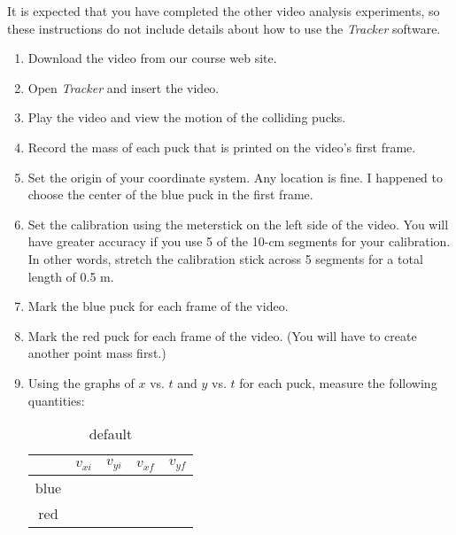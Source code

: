 It is expected that you have completed the other video analysis experiments, so these instructions do not include details about how to use the \emph{Tracker} software.

\begin{enumerate}
	\item Download the video  from our course web site.
	\item Open \emph{Tracker} and insert the video.
	\item Play the video and view the motion of  the colliding pucks.
	\item Record the mass of each puck that is printed on the video's first frame.
	
	
	\item Set the origin of your coordinate system. Any location is fine. I happened to choose the center of the blue puck in the first frame.
	\item Set the calibration using the meterstick on the left side of the video. You will have greater accuracy if you use 5 of the 10-cm segments for your calibration. In other words, stretch the calibration stick across 5 segments for a total length of 0.5 m.
	\item Mark the blue puck for each frame of the video.
	\item Mark the red puck for each frame of the video. (You will have to create another point mass first.)
	\item Using the graphs of $x$ vs. $t$ and $y$ vs. $t$ for each puck, measure the following quantities:
	
\begin{table}[htdp]
\caption{default}
\begin{center}
\begin{tabular}{|c|c|c|c|c|}
\hline
 & $v_{xi}$ & $v_{yi}$ & $v_{xf}$ & $v_{yf}$ \\
\hline
\hline
blue & & & & \\
\hline
red & & & & \\
\hline
\end{tabular}
\end{center}
\label{default}
\end{table}%

\end{enumerate}

